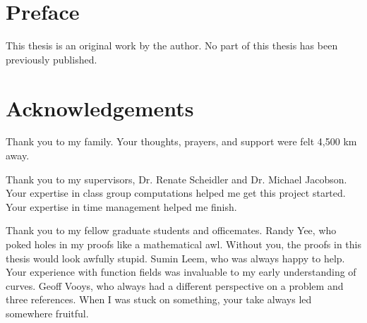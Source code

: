 \documentclass{ucalgarythesis}
\numberwithin{equation}{section}
\numberwithin{figure}{section}
\numberwithin{table}{section}
\numberwithin{algorithm}{section}
\theoremstyle{plain}
\theoremstyle{definition}
\begin{document}

\begin{thesisabstract}  



\end{thesisabstract}




  \chapter{Preface}
 
  This thesis is an original work by the author. No part of this thesis has been previously published.
 
   
 

  \chapter{Acknowledgements}  
  
Thank you to my family.
Your thoughts, prayers, and support were felt 4,500 km away.

Thank you to my supervisors, Dr. Renate Scheidler and Dr. Michael Jacobson.
Your expertise in class group computations helped me get this project started.
Your expertise in time management helped me finish.

Thank you to my fellow graduate students and officemates.
Randy Yee, who poked holes in my proofs like a mathematical awl.
Without you, the proofs in this thesis would look awfully stupid.
Sumin Leem, who was always happy to help.
Your experience with function fields was invaluable to my early understanding of curves.
Geoff Vooys, who always had a different perspective on a problem and three references.
When I was stuck on something, your take always led somewhere fruitful.
\end{document}

